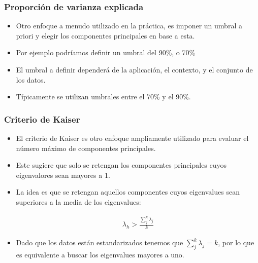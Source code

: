 \documentclass[
  shownotes,
  xcolor={svgnames},
  hyperref={colorlinks,citecolor=DarkBlue,linkcolor=DarkRed,urlcolor=DarkBlue}
  , aspectratio=169]{beamer}
\begin{document}
\begin{frame}
\frametitle{Proporción de varianza explicada}


\begin{itemize}


  \item Otro enfoque a menudo utilizado en la práctica, es imponer un umbral a priori y elegir los componentes principales en base a esta.
  \medskip
  \item  Por ejemplo podríamos definir un umbral del 90\%, o 70\%
  \medskip
  \item El umbral a definir dependerá de la aplicación, el contexto, y el conjunto de los datos. 
  \medskip
  \item Típicamente se utilizan umbrales entre el 70\% y el 90\%.
\end{itemize}
\end{frame}

\begin{frame}
\frametitle{Criterio de Kaiser}

\begin{itemize}


\item El criterio de Kaiser es otro enfoque ampliamente utilizado para evaluar el número máximo de componentes principales. 
\medskip
\item Este sugiere que solo se retengan los componentes principales cuyos eigenvalores sean mayores a 1. 
\medskip
\item La idea es que se retengan aquellos componentes cuyos eigenvalues sean superiores a la media de los eigenvalues:

\begin{align}
\lambda_h> \frac{\sum_j^k \lambda_j}{k}
\end{align}

\medskip
\item Dado que los datos están estandarizados tenemos que \(\sum_j^k \lambda_j=k\), por lo que es equivalente a buscar los eigenvalues mayores a uno.
\end{itemize}
\end{frame}

\end{document}
